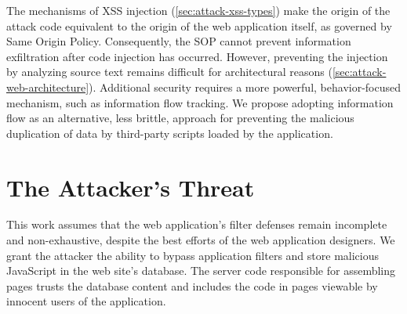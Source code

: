 

The mechanisms of XSS injection (\autoref{sec:attack-xss-types}) make the origin of the attack code equivalent to the origin of the web application itself, as governed by Same Origin Policy.
Consequently, the SOP cannot prevent information exfiltration after code injection has occurred.
However, preventing the injection by analyzing source text remains difficult for architectural reasons (\autoref{sec:attack-web-architecture}).
Additional security requires a more powerful, behavior-focused mechanism, such as information flow tracking.
We propose adopting information flow as an alternative, less brittle, approach for preventing the malicious duplication of data by third-party scripts loaded by the application.

\section{The Attacker's Threat}\label{sec:defense-attackers-threat}

This work assumes that the web application's filter defenses remain incomplete and non-exhaustive, despite the best efforts of the web application designers.
We grant the attacker the ability to bypass application filters and store malicious JavaScript in the web site's database.
The server code responsible for assembling pages trusts the database content and includes the code in pages viewable by innocent users of the application.

